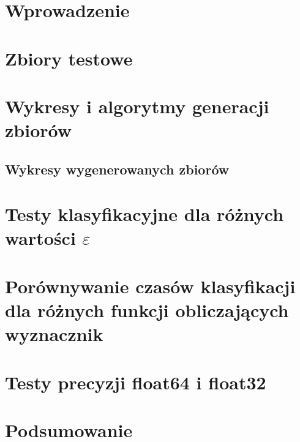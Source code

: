 \documentclass{sprawozdanie-agh}
\begin{document}

\stronatytulowa{}

\section{Wprowadzenie}

\section{Zbiory testowe}

\section{Wykresy i algorytmy generacji zbiorów}
\subsection{Wykresy wygenerowanych zbiorów}




\section{Testy klasyfikacyjne dla różnych wartości $\varepsilon$}


\section{Porównywanie czasów klasyfikacji dla różnych funkcji obliczających wyznacznik}

\section{Testy precyzji float64 i float32}

\section{Podsumowanie}

\end{document}
